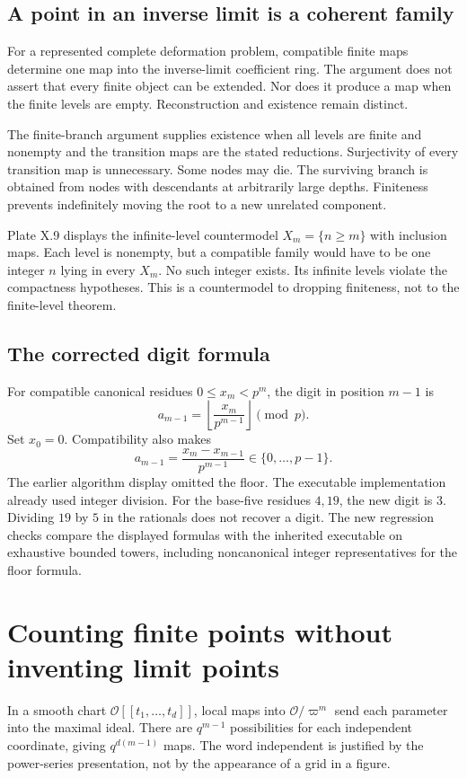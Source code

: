\subsection{A point in an inverse limit is a coherent family}
For a represented complete deformation problem, compatible finite maps determine
one map into the inverse-limit coefficient ring. The argument does not assert
that every finite object can be extended. Nor does it produce a map when the
finite levels are empty. Reconstruction and existence remain distinct.

The finite-branch argument supplies existence when all levels are finite and
nonempty and the transition maps are the stated reductions. Surjectivity of every
transition map is unnecessary. Some nodes may die. The surviving branch is
obtained from nodes with descendants at arbitrarily large depths. Finiteness
prevents indefinitely moving the root to a new unrelated component.

Plate X.9 displays the infinite-level countermodel $X_m=\{n\ge m\}$ with inclusion
maps. Each level is nonempty, but a compatible family would have to be one integer
$n$ lying in every $X_m$. No such integer exists. Its infinite levels violate the
compactness hypotheses. This is a countermodel to dropping finiteness, not to the
finite-level theorem.

\subsection{The corrected digit formula}
For compatible canonical residues $0\le x_m<p^m$, the digit in position $m-1$ is
\[
 a_{m-1}=\left\lfloor\frac{x_m}{p^{m-1}}\right\rfloor\pmod p.
\]
Set $x_0=0$. Compatibility also makes
\[
 a_{m-1}=\frac{x_m-x_{m-1}}{p^{m-1}}\in\{0,\ldots,p-1\}.
\]
The earlier algorithm display omitted the floor. The executable implementation
already used integer division. For the base-five residues $4,19$, the new digit
is $3$. Dividing $19$ by $5$ in the rationals does not recover a digit. The new
regression checks compare the displayed formulas with the inherited executable
on exhaustive bounded towers, including noncanonical integer representatives
for the floor formula.

\clearpage
\section{Counting finite points without inventing limit points}
In a smooth chart $\mathcal O[[t_1,\ldots,t_d]]$, local maps into
$\mathcal O/\varpi^m$ send each parameter into the maximal ideal. There are
$q^{m-1}$ possibilities for each independent coordinate, giving
$q^{d(m-1)}$ maps. The word independent is justified by the power-series
presentation, not by the appearance of a grid in a figure.

